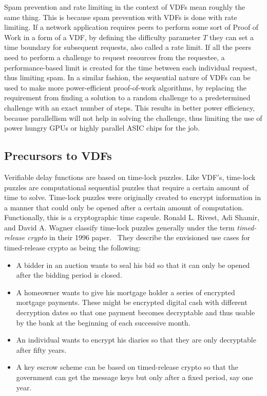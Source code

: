 Spam prevention and rate limiting in the context of VDFs mean roughly the same thing. This is because spam prevention with VDFs is done with rate limiting. If a network application requires peers to perform some sort of Proof of Work in a form of a VDF, by defining the difficulty parameter \(T\) they can set a time boundary for subsequent requests, also called a rate limit. If all the peers need to perform a challenge to request resources from the requestee, a performance-based limit is created for the time between each individual request, thus limiting spam. In a similar fashion, the sequential nature of VDFs can be used to make more power-efficient proof-of-work algorithms, by replacing the requirement from finding a solution to a random challenge to a predetermined challenge with an exact number of steps. This results in better power efficiency, because parallellism will not help in solving the challenge, thus limiting the use of power hungry GPUs or highly parallel ASIC chips for the job.


\subsection{Precursors to VDFs}
Verifiable delay functions are based on time-lock puzzles. Like VDF's, time-lock puzzles are computational sequential puzzles that require a certain amount of time to solve.\cite{Rivest_undated-qr} Time-lock puzzles were originally created to encrypt information in a manner that could only be opened after a certain amount of computation. Functionally, this is a cryptographic time capsule. Ronald L. Rivest, Adi Shamir, and David A. Wagner classify time-lock puzzles generally under the term \emph{timed-release crypto} in their 1996 paper.~\cite{Rivest_undated-qr} They describe the envisioned use cases for timed-release crypto as being the following:

\begin{itemize}
	\item A bidder in an auction wants to seal his bid so that it can only be opened after the bidding period is closed.
	\item A homeowner wants to give his mortgage holder a series of encrypted mortgage payments. These might be encrypted digital cash with different decryption dates so that one payment becomes decryptable and thus usable by the bank at the beginning of each successive month.
	\item An individual wants to encrypt his diaries so that they are only decryptable after fifty years.
	\item A key escrow scheme can be based on timed-release crypto so that the government can get the message keys but only after a fixed period, say one year.
\end{itemize}

